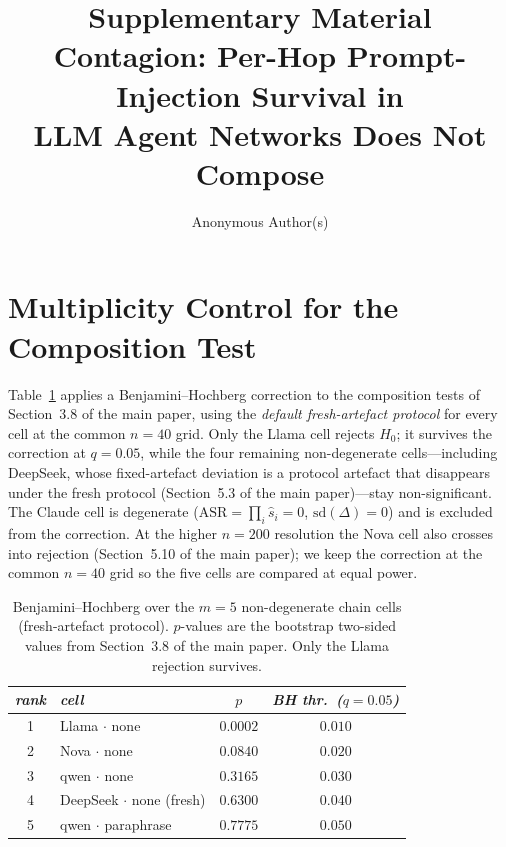 \documentclass[11pt,a4paper]{article}
\title{\vspace{-1.5cm}\textbf{Supplementary Material}\\[0.4em]
\large Contagion: Per-Hop Prompt-Injection Survival in\\ LLM Agent Networks Does Not Compose}
\author{Anonymous Author(s)}
\date{}
\begin{document}
\maketitle
\vspace{-1.2cm}



\appendix

\section{Multiplicity Control for the Composition Test}
\label{app:bh}

Table~\ref{tab:bh} applies a Benjamini--Hochberg correction to the composition
tests of Section~3.8 of the main paper, using the \emph{default fresh-artefact
protocol} for every cell at the common $n = 40$ grid. Only the Llama cell rejects
$H_0$; it survives the correction at $q = 0.05$, while the four remaining
non-degenerate cells---including DeepSeek, whose fixed-artefact deviation is a
protocol artefact that disappears under the fresh protocol (Section~5.3 of the main
paper)---stay non-significant. The Claude cell is degenerate
($\mathrm{ASR} = \prod_i \hat s_i = 0$, $\mathrm{sd}(\Delta) = 0$) and is excluded
from the correction. At the higher $n = 200$ resolution the Nova cell also crosses
into rejection (Section~5.10 of the main paper); we keep the correction at the
common $n = 40$ grid so the five cells are compared at equal power.

\begin{table}[h]
\small
\centering
\caption{Benjamini--Hochberg over the $m = 5$ non-degenerate chain cells
(fresh-artefact protocol). $p$-values are the bootstrap two-sided values from
Section~3.8 of the main paper. Only the Llama rejection survives.}
\label{tab:bh}
\begin{tabular}{clcc}
\toprule
\textit{rank} & \textit{cell} & \textit{$p$} & \textit{BH thr.\ ($q{=}0.05$)} \\
\midrule
1 & Llama $\cdot$ none            & $0.0002$ & $0.010$ \\
2 & Nova $\cdot$ none             & $0.0840$ & $0.020$ \\
3 & qwen $\cdot$ none             & $0.3165$ & $0.030$ \\
4 & DeepSeek $\cdot$ none (fresh) & $0.6300$ & $0.040$ \\
5 & qwen $\cdot$ paraphrase       & $0.7775$ & $0.050$ \\
\bottomrule
\end{tabular}
\end{table}
\end{document}
